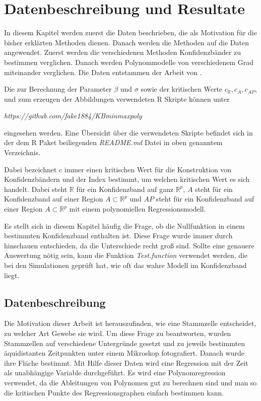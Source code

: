 \documentclass[12pt,a4paper]{article}
\theoremstyle{definition}
\theoremstyle{definition}
\theoremstyle{definition}
\theoremstyle{definition}
\begin{document}
\newpage
\section{Datenbeschreibung und Resultate}
\label{Datenbeschreibung und Resultate}
In diesem Kapitel werden zuerst die Daten beschrieben, die als Motivation für die bisher erklärten Methoden dienen. Danach werden die Methoden auf die Daten angewendet. Zuerst werden die verschiedenen Methoden Konfidenzbänder zu bestimmen verglichen. Danach werden Polynommodelle von verschiedenem Grad miteinander verglichen. Die Daten entstammen der Arbeit von \cite{Rehfeldt10}.

Die zur Berechnung der Parameter $\beta$ und  $\sigma$ sowie der kritischen Werte $c_{\mathbb{R}}, c_{A}, c_{AP}$, und zum erzeugen der Abbildungen verwendeten R Skripte können unter 

\begin{center}
\textit{https://github.com/fake1884/KBminmaxpoly} 
\end{center}

eingesehen werden. Eine Übersicht über die verwendeten Skripte befindet sich in der dem R Paket beiliegenden \textit{README.md} Datei in oben genanntem Verzeichnis.

Dabei bezeichnet $c$ immer einen kritischen Wert für die Konstruktion von Konfidenzbändern und der Index bestimmt, um welchen kritischen Wert es sich handelt. Dabei steht $\mathbb{R}$ für ein Konfidenzband auf ganz $\mathbb{R}^{p}$, $A$ steht für ein Konfidenzband auf einer Region $A \subset \mathbb{R}^{p}$ und $AP$ steht für ein Konfidenzband auf einer Region $A \subset \mathbb{R}^{p}$ mit einem polynomiellen Regressionsmodell.

Es stellt sich in diesem Kapitel häufig die Frage, ob die Nullfunktion in einem bestimmten Konfidenzband enthalten ist. Diese Frage wurde immer durch hinschauen entschieden, da die Unterschiede recht groß sind. Sollte eine genauere Auswertung nötig sein, kann die Funktion \textit{Test.function} verwendet werden, die bei den Simulationen geprüft hat, wie oft das wahre Modell im Konfidenzband liegt.

\subsection{Datenbeschreibung}
Die Motivation dieser Arbeit ist herauszufinden, wie eine Stammzelle entscheidet, zu welcher Art Gewebe sie wird. Um diese Frage zu beantworten, wurden Stammzellen auf verschiedene Untergründe gesetzt und zu jeweils bestimmten äquidistanten Zeitpunkten unter einem Mikroskop fotografiert. Danach wurde ihre Fläche bestimmt. Mit Hilfe dieser Daten wird eine Regression mit der Zeit als unabhängige Variable durchgeführt. Es wird eine Polynomregression verwendet, da die Ableitungen von Polynomen gut zu berechnen sind und man so die kritischen Punkte des Regressionsgraphen einfach bestimmen kann.
\end{document}
